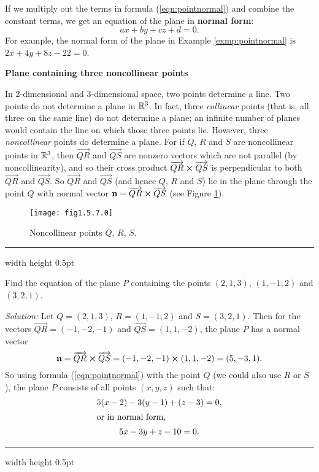 If we multiply out the terms in formula (\ref{eqn:pointnormal}) and combine the constant terms, we get an
equation of the plane in \textbf{normal form}:
\begin{equation}
 ax + by + cz + d = 0.
\end{equation}
For example, the normal form of the plane in Example \ref{exmp:pointnormal} is $2x + 4y + 8z - 22 = 0$.
\pagebreak[3]
\par\noindent\textbf{\large{Plane containing three noncollinear points}}\normalsize\smallskip

In 2-dimensional and 3-dimensional space, two points determine a line. Two points do not determine a plane in
$\mathbb{R}^{3}$. 
In fact, three \emph{collinear} points (that is, all three on the same line)
do not determine a plane; 
an infinite number of planes would contain the line on which those three points lie.
However, three \emph{noncollinear} points do determine a plane. For if $Q$, $R$ and $S$ are noncollinear points in
$\mathbb{R}^{3}$, then $\overrightarrow{QR}$ and $\overrightarrow{QS}$ are  nonzero vectors which are not parallel (by
noncollinearity), and so their cross product $\overrightarrow{QR} \bm{\times} \overrightarrow{QS}$ is perpendicular to
both $\overrightarrow{QR}$ and $\overrightarrow{QS}$. So $\overrightarrow{QR}$ and
$\overrightarrow{QS}$ (and hence $Q$, $R$ and $S$) lie in the plane through the point $Q$ with normal vector
$\mathbf{n} = \overrightarrow{QR} \bm{\times} \overrightarrow{QS}$ (see Figure \ref{fig:plane3pts}).

\begin{figure}[h]
 \begin{center}
  \texttt{[image: fig1.5.7.0]}
 \end{center}
 \caption[]{\quad Noncollinear points $Q$, $R$, $S$.}
 \label{fig:plane3pts}
\end{figure}

\hrule width \textwidth height 0.5pt
\begin{exmp}\label{exmp:plane3pts}
 Find the equation of the plane $P$ containing the points $(2,1,3)$, $(1,-1,2)$ and $(3,2,1)$.\smallskip
 \par\noindent\emph{Solution:} Let $Q = (2,1,3)$, $R = (1,-1,2)$ and $S = (3,2,1)$. Then for the vectors
 $\overrightarrow{QR} = (-1,-2,-1)$ and $\overrightarrow{QS} = (1,1,-2)$, the plane $P$ has a normal vector
 \begin{displaymath}
  \mathbf{n} = \overrightarrow{QR} \bm{\times} \overrightarrow{QS} = (-1,-2,-1) \bm{\times} (1,1,-2) = (5,-3,1).
 \end{displaymath}
 So using formula (\ref{eqn:pointnormal}) with the point $Q$ (we could also use $R$ or $S$), the plane $P$ consists of
 all points $(x,y,z)$ such that:
 \begin{gather*}
  5(x - 2) - 3(y - 1) + (z - 3) = 0,\\
  \intertext{or in normal form,}
  5x - 3y + z - 10 = 0.
 \end{gather*}
\end{exmp}
\hrule width \textwidth height 0.5pt
\smallskip

